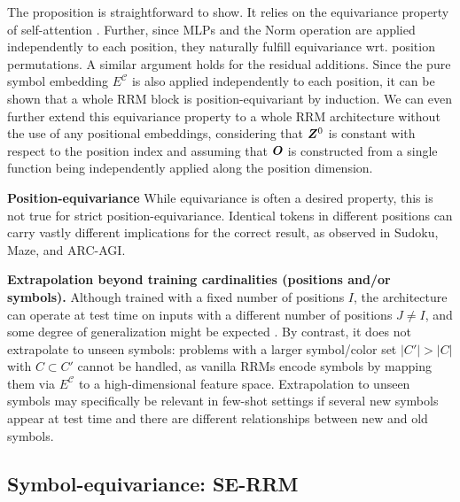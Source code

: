 \documentclass{article}
\theoremstyle{plain}
\theoremstyle{definition}
\theoremstyle{remark}
\renewcommand{\paragraph}[1]{\textbf{#1}\;}
\begin{document}
The proposition is straightforward to show. It relies on the equivariance property of self-attention \citep{ilse2018attention,lee2019set}. Further, since MLPs and the $\text{Norm}$ operation are applied independently to each position, they naturally fulfill equivariance wrt. position permutations. A similar argument holds for the residual additions. Since the pure symbol embedding $E^{\mathcal C}$ is also applied independently to each position, it can be shown that a whole RRM block is position-equivariant by induction. We can even further extend this equivariance property to a whole RRM architecture without the use of any positional embeddings, considering that $\bm{Z}^0$ is constant with respect to the position index and assuming that $\bm{O}$ is constructed from a single function being independently applied along the position dimension.


\paragraph{Position-equivariance} While equivariance is often a desired property, this is not true for strict position-equivariance. Identical tokens in different positions can carry vastly different implications for the correct result, as observed in Sudoku, Maze, and ARC-AGI.

\paragraph{Extrapolation beyond training cardinalities (positions and/or symbols).}
Although trained with a fixed number of positions $I$, the architecture can operate at test time on inputs with a different number of positions $J \neq I$, and some degree of generalization might be expected \citep{kazemnejad2023impact,anil2022exploring}. By contrast, it does not extrapolate to unseen symbols: problems with a larger symbol/color set $|C'|>|C|$ with $C \subset C'$ cannot be handled, as vanilla RRMs encode symbols by mapping them via  $E^{\mathcal C}$ to a high-dimensional feature space. Extrapolation to unseen symbols may  specifically be relevant in few-shot settings if several new symbols appear at test time and there are different relationships between new and old symbols.

\subsection{Symbol-equivariance: SE-RRM}
\end{document}
